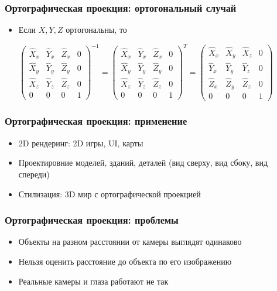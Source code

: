 \documentclass{beamer}
\begin{document}
\begin{frame}[fragile]
\frametitle{Ортографическая проекция: ортогональный случай}
\begin{itemize}
\item Если \begin{math}X, Y, Z\end{math} ортогональны, то 
\begin{center}
\begin{math}
\begin{pmatrix}
\hat X_x & \hat Y_x & \hat Z_x & 0 \\
\hat X_y & \hat Y_y & \hat Z_y & 0 \\
\hat X_z & \hat Y_z & \hat Z_z & 0 \\
0 & 0 & 0 & 1
\end{pmatrix}^{-1}
=
\begin{pmatrix}
\hat X_x & \hat Y_x & \hat Z_x & 0 \\
\hat X_y & \hat Y_y & \hat Z_y & 0 \\
\hat X_z & \hat Y_z & \hat Z_z & 0 \\
0 & 0 & 0 & 1
\end{pmatrix}^T
=
\begin{pmatrix}
\hat X_x & \hat X_y & \hat X_z & 0 \\
\hat Y_x & \hat Y_y & \hat Y_z & 0 \\
\hat Z_x & \hat Z_y & \hat Z_z & 0 \\
0 & 0 & 0 & 1
\end{pmatrix}
\end{math}
\end{center}
\end{itemize}
\end{frame}

\begin{frame}[fragile]
\frametitle{Ортографическая проекция: применение}
\begin{itemize}
\pause
\item 2D рендеринг: 2D игры, UI, карты
\pause
\item Проектировние моделей, зданий, деталей (вид сверху, вид сбоку, вид спереди)
\pause
\item Стилизация: 3D мир с ортографической проекцией
\end{itemize}
\end{frame}

\begin{frame}[fragile]
\frametitle{Ортографическая проекция: проблемы}
\begin{itemize}
\pause
\item Объекты на разном расстоянии от камеры выглядят одинаково
\pause
\item Нельзя оценить расстояние до объекта по его изображению
\pause
\item Реальные камеры и глаза работают не так
\end{itemize}
\end{frame}
\end{document}
